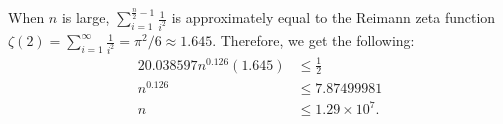 When $n$ is large, $\sum_{i=1}^{\frac{n}{2}-1}\frac{1}{i^2}$ is approximately equal to the Reimann zeta function $\zeta (2) = \sum_{i=1}^{\infty}\frac{1}{i^2} = \pi^2/6 \approx 1.645$. Therefore, we get the following:
\begin{alignat}{2}
0.038597n^{0.126}(1.645)  & \leq \frac{1}{2} \nonumber \\
n^{0.126} &\leq 7.87499981 \nonumber \\
n &\leq 1.29 \times 10^7.
\end{alignat}




